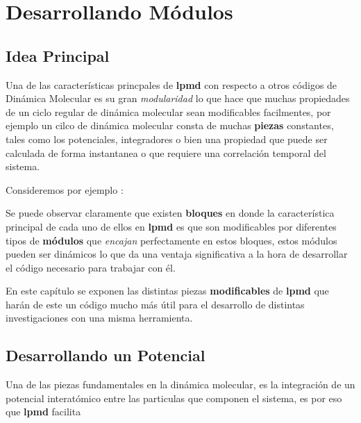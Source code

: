 \documentclass[a4paper,10pt]{scrbook}
\newcommand{\lpmd}{\textbf{lpmd }}
\begin{document}
\chapter{Desarrollando M\'odulos}
\label{chap:own}

\section{Idea Principal}

Una de las caracter\'isticas princpales de \lpmd con respecto a otros c\'odigos de Din\'amica Molecular es su gran \textit{modularidad} lo que hace que muchas propiedades de un ciclo regular de din\'amica molecular sean modificables facilmentes, por ejemplo un cilco de din\'amica molecular consta de muchas \textbf{piezas} constantes, tales como los potenciales, integradores o bien una propiedad que puede ser calculada de forma instantanea o que requiere una correlaci\'on temporal del sistema.

Consideremos por ejemplo :

Se puede observar claramente que existen \textbf{bloques} en donde la caracter\'istica principal de cada uno de ellos en \lpmd es que son modificables por diferentes tipos de \textbf{m\'odulos} que \textit{encajan} perfectamente en estos bloques, estos m\'odulos pueden ser din\'amicos lo que da una ventaja significativa a la hora de desarrollar el c\'odigo necesario para trabajar con \'el.

En este cap\'itulo se exponen las distintas piezas \textbf{modificables} de \lpmd que har\'an de este un c\'odigo mucho m\'as \'util para el desarrollo de distintas investigaciones con una misma herramienta.

\section{Desarrollando un Potencial}

Una de las piezas fundamentales en la din\'amica molecular, es la integraci\'on de un potencial interat\'omico entre las particulas que componen el sistema, es por eso que \lpmd facilita 
\end{document}
